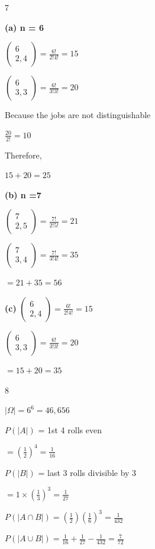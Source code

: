 \documentclass[12 pt]{article}
\begin{document}
    \begin{exercise}{7}
    \hfill

    \textbf{(a) n = 6} 

    $\begin{pmatrix}
        6 \\
        2, 4
    \end{pmatrix} = \frac{6!}{2!4!} = 15$

    $\begin{pmatrix}
        6 \\
        3, 3
    \end{pmatrix} = \frac{6!}{3!3!} = 20$

    Because the jobs are not distinguishable

    $\frac{20}{2!} = 10$

    Therefore,

    $15 + 20 = 25$

    \textbf{(b) n =7}

    $\begin{pmatrix}
        7 \\
        2, 5
    \end{pmatrix} = \frac{7!}{2!5!} = 21$

    $\begin{pmatrix}
        7 \\
        3, 4
    \end{pmatrix} = \frac{7!}{3!4!} = 35$

    $= 21 + 35 = 56$

    \textbf{(c)} $\begin{pmatrix}
        6 \\
        2, 4
    \end{pmatrix} = \frac{6!}{2!4!} = 15$

    $\begin{pmatrix}
        6 \\
        3, 3
    \end{pmatrix} = \frac{6!}{3!3!} = 20$

    $= 15 + 20 = 35$
        
    \end{exercise}



    \begin{exercise}{8}
    \hfill

    $| \Omega | = 6^6 = 46,656$

    $P(|A|)$ = 1st 4 rolls even

    $= (\frac{1}{2})^4 = \frac{1}{16}$

    $P(|B|)$ = last 3 rolls divisible by 3

    $= 1 \times (\frac{1}{3})^3 = \frac{1}{27}$

    $P(|A \cap B|) = (\frac{1}{2})(\frac{1}{6})^3 = \frac{1}{432}$

    $P(|A \cup B|) = \frac{1}{16} + \frac{1}{27} - \frac{1}{432} = \frac{7}{72}$
    \end{exercise}
\end{document}
